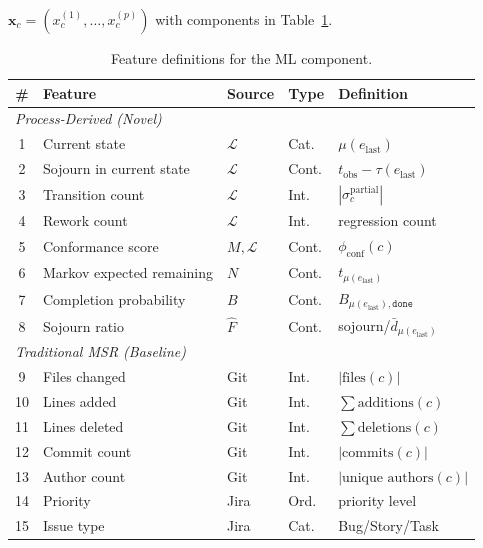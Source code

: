 \begin{definition}
\label{def:feature-vector}
$\mathbf{x}_c = (x_c^{(1)}, \ldots, x_c^{(p)})$ with components in
Table~\ref{tab:features}.
\end{definition}

\begin{table}[htbp]
\centering
\caption{Feature definitions for the ML component.}
\label{tab:features}
\small
\begin{tabular}{cllll}
\toprule
\textbf{\#} & \textbf{Feature} & \textbf{Source} & \textbf{Type} & \textbf{Definition} \\
\midrule
\multicolumn{5}{l}{\textit{Process-Derived (Novel)}} \\
\midrule
1 & Current state                & $\mathcal{L}$ & Cat.   & $\mu(e_{\text{last}})$ \\
2 & Sojourn in current state     & $\mathcal{L}$ & Cont.  & $t_{\text{obs}} - \tau(e_{\text{last}})$ \\
3 & Transition count             & $\mathcal{L}$ & Int.   & $|\sigma_c^{\text{partial}}|$ \\
4 & Rework count                 & $\mathcal{L}$ & Int.   & regression count \\
5 & Conformance score            & $M, \mathcal{L}$ & Cont. & $\phi_{\text{conf}}(c)$ \\
6 & Markov expected remaining    & $N$           & Cont.  & $t_{\mu(e_{\text{last}})}$ \\
7 & Completion probability       & $B$           & Cont.  & $B_{\mu(e_{\text{last}}), \texttt{done}}$ \\
8 & Sojourn ratio                & $\hat{F}$     & Cont.  & sojourn/$\bar{d}_{\mu(e_{\text{last}})}$ \\
\midrule
\multicolumn{5}{l}{\textit{Traditional MSR (Baseline)}} \\
\midrule
9  & Files changed     & Git  & Int.    & $|\text{files}(c)|$ \\
10 & Lines added       & Git  & Int.    & $\sum \text{additions}(c)$ \\
11 & Lines deleted     & Git  & Int.    & $\sum \text{deletions}(c)$ \\
12 & Commit count      & Git  & Int.    & $|\text{commits}(c)|$ \\
13 & Author count      & Git  & Int.    & $|\text{unique authors}(c)|$ \\
14 & Priority          & Jira & Ord.    & priority level \\
15 & Issue type        & Jira & Cat.    & Bug/Story/Task \\
\bottomrule
\end{tabular}
\end{table}

